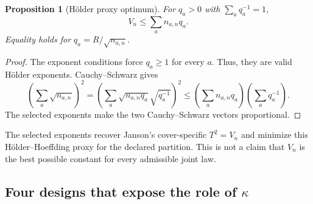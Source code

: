\documentclass[11pt]{article}
\newtheorem{proposition}[theorem]{Proposition}
\theoremstyle{definition}
\begin{document}
\begin{proposition}[H{\"o}lder proxy optimum]\label{prop:holder-optimum}
For $q_a>0$ with $\sum_aq_a^{-1}=1$,
\begin{equation}
  V_n\le\sum_an_{a,n}q_a.
\end{equation}
Equality holds for $q_a=R/\sqrt{n_{a,n}}$.
\end{proposition}

\begin{proof}
The exponent conditions force $q_a\ge1$ for every $a$.  Thus, they are valid H{\"o}lder
exponents.
Cauchy--Schwarz gives
\begin{equation}
  \left(\sum_a\sqrt{n_{a,n}}\right)^2
  =\left(\sum_a\sqrt{n_{a,n}q_a}\sqrt{q_a^{-1}}\right)^2
  \le\left(\sum_an_{a,n}q_a\right)\left(\sum_aq_a^{-1}\right).
\end{equation}
The selected exponents make the two Cauchy--Schwarz vectors proportional.
\end{proof}

The selected exponents recover Janson's cover-specific $T^2=V_n$ and minimize this
H{\"o}lder--Hoeffding proxy for the declared partition.  This is not a claim that $V_n$ is the best
possible constant for every admissible joint law.

\subsection*{Four designs that expose the role of \texorpdfstring{$\kappa$}{kappa}}
\end{document}
